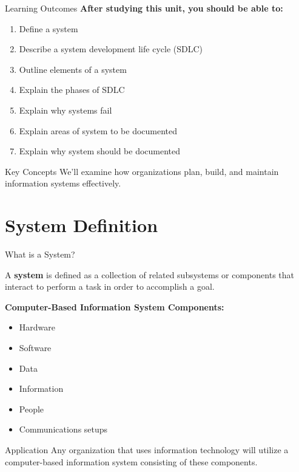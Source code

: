 \documentclass[aspectratio=169]{beamer}
\begin{document}
\begin{frame}{Learning Outcomes}
    \textbf{After studying this unit, you should be able to:}
    \begin{enumerate}
        \item  Define a system
        \item  Describe a system development life cycle (SDLC)
        \item  Outline elements of a system
        \item  Explain the phases of SDLC
        \item  Explain why systems fail
        \item  Explain areas of system to be documented
        \item  Explain why system should be documented
    \end{enumerate}
    
    \vspace{0.3cm}
    \begin{exampleblock}{Key Concepts}
        We'll examine how organizations plan, build, and maintain information systems effectively.
    \end{exampleblock}
\end{frame}

\section{System Definition}

\begin{frame}{What is a System?}
    \begin{definition}
        A \textbf{system} is defined as a collection of related subsystems or components that interact to perform a task in order to accomplish a goal.
    \end{definition}
    
    \vspace{0.3cm}
    \textbf{Computer-Based Information System Components:}
    \begin{itemize}
        \item   Hardware
        \item  Software
        \item  Data
        \item   Information
        \item   People
        \item   Communications setups
    \end{itemize}
    
    \vspace{0.2cm}
    \begin{exampleblock}{Application}
        Any organization that uses information technology will utilize a computer-based information system consisting of these components.
    \end{exampleblock}
\end{frame}
\end{document}
